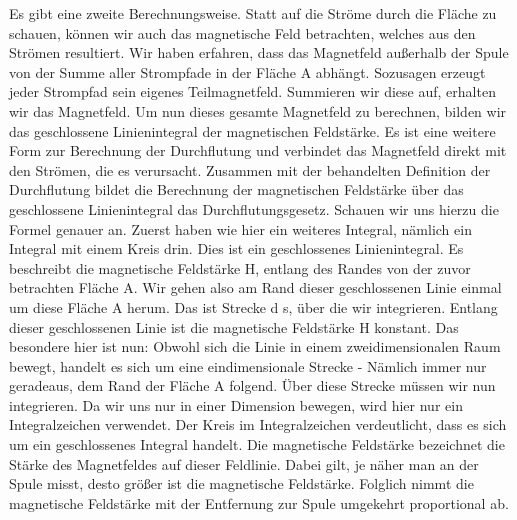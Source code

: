 \begin{frame}
{	Es gibt eine zweite Berechnungsweise. Statt auf die Ströme durch die Fläche zu schauen, können wir auch das magnetische Feld betrachten, welches aus den Strömen resultiert.
	Wir haben erfahren, dass das Magnetfeld außerhalb der Spule von der Summe aller Strompfade in der Fläche A abhängt. Sozusagen erzeugt jeder Strompfad sein eigenes Teilmagnetfeld. Summieren wir diese auf, erhalten wir das Magnetfeld. Um nun dieses gesamte Magnetfeld zu berechnen, bilden wir das geschlossene Linienintegral der magnetischen Feldstärke. Es ist eine weitere Form zur Berechnung der Durchflutung und verbindet das Magnetfeld direkt mit den Strömen, die es verursacht. Zusammen mit der behandelten Definition der Durchflutung bildet die Berechnung der magnetischen Feldstärke über das geschlossene Linienintegral das Durchflutungsgesetz.
	Schauen wir uns hierzu die Formel genauer an. Zuerst haben wie hier ein weiteres Integral, nämlich ein Integral mit einem Kreis drin. Dies ist ein geschlossenes Linienintegral. Es beschreibt die magnetische Feldstärke H, entlang des Randes von der zuvor betrachten Fläche A. Wir gehen also am Rand dieser geschlossenen Linie einmal um diese Fläche A herum. Das ist Strecke d s, über die wir integrieren. Entlang dieser geschlossenen Linie ist die magnetische Feldstärke H konstant. Das besondere hier ist nun: Obwohl sich die Linie in einem zweidimensionalen Raum bewegt, handelt es sich um eine eindimensionale Strecke - Nämlich immer nur geradeaus, dem Rand der Fläche A folgend.
	Über diese Strecke müssen wir nun integrieren. Da wir uns nur in einer Dimension bewegen, wird hier nur ein Integralzeichen verwendet. Der Kreis im Integralzeichen verdeutlicht, dass es sich um ein geschlossenes Integral handelt.
	Die magnetische Feldstärke bezeichnet die Stärke des Magnetfeldes auf dieser Feldlinie. Dabei gilt, je näher man an der Spule misst, desto größer ist die magnetische Feldstärke. Folglich nimmt die magnetische Feldstärke mit der Entfernung zur Spule umgekehrt proportional ab.}
\end{frame}


